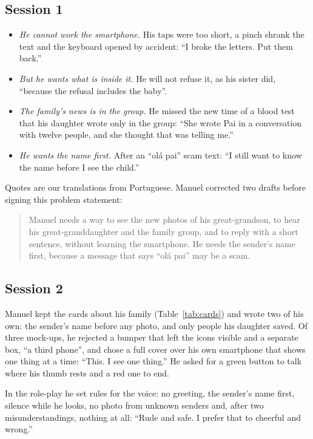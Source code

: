 \documentclass[acmtog,nonacm]{acmart}
\begin{document}
\subsection{Session 1}
\begin{itemize}
  \item \emph{He cannot work the smartphone.} His taps were too short, a pinch shrank the text and the keyboard opened by accident: ``I broke the letters. Put them back.''
  \item \emph{But he wants what is inside it.} He will not refuse it, as his sister did, ``because the refusal includes the baby''.
  \item \emph{The family's news is in the group.} He missed the new time of a blood test that his daughter wrote only in the group: ``She wrote Pai in a conversation with twelve people, and she thought that was telling me.''
  \item \emph{He wants the name first.} After an ``ol\'a pai'' scam text: ``I still want to know the name before I see the child.''
\end{itemize}
Quotes are our translations from Portuguese. Manuel corrected two drafts before signing this problem statement:
\begin{quote}
Manuel needs a way to see the new photos of his great-grandson, to hear his great-granddaughter and the family group, and to reply with a short sentence, without learning the smartphone. He needs the sender's name first, because a message that says ``ol\'a pai'' may be a scam.
\end{quote}

\subsection{Session 2}
Manuel kept the cards about his family (Table~\ref{tab:cards}) and wrote two of his own: the sender's name before any photo, and only people his daughter saved. Of three mock-ups, he rejected a bumper that left the icons visible and a separate box, ``a third phone'', and chose a full cover over his own smartphone that shows one thing at a time: ``This. I see one thing.'' He asked for a green button to talk where his thumb rests and a red one to end.

In the role-play he set rules for the voice: no greeting, the sender's name first, silence while he looks, no photo from unknown senders and, after two misunderstandings, nothing at all: ``Rude and safe. I prefer that to cheerful and wrong.''
\end{document}
